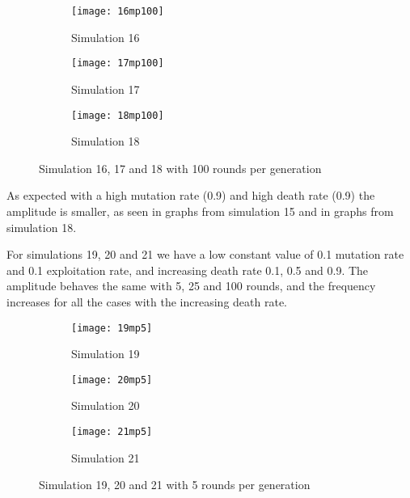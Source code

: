 \begin{figure}[H]       
    \centering
    \begin{subfigure}[b]{0.3\textwidth}
	\centering
	{\texttt{[image: 16mp100]}}   
    	\caption{Simulation 16}
	\label{fig:mpsim16100}
    \end{subfigure}
    \hfill
    \begin{subfigure}[b]{0.3\textwidth}
	\centering
	{\texttt{[image: 17mp100]}}   
    	\caption{Simulation 17}
	\label{fig:mpsim17100}
    \end{subfigure}
    \hfill
    \begin{subfigure}[b]{0.3\textwidth}
	\centering
	{\texttt{[image: 18mp100]}}   
    	\caption{Simulation 18}
	\label{fig:mpsim18100}
    \end{subfigure}
    \caption{Simulation 16, 17 and 18 with 100 rounds per generation}
    \label{mpsim161718simulations100}
\end{figure}

As expected with a high mutation rate (0.9) and high death rate (0.9) the amplitude is smaller, as seen in graphs from simulation 15 and in graphs from simulation 18.

For simulations 19, 20 and 21 we have a low constant value of 0.1 mutation rate and 0.1 exploitation rate, and increasing death rate 0.1, 0.5 and 0.9. The amplitude behaves the same with 5, 25 and 100 rounds, and the frequency increases for all the cases with the increasing death rate.

\begin{figure}[H]       
    \centering
    \begin{subfigure}[b]{0.3\textwidth}
	\centering
	{\texttt{[image: 19mp5]}}   
    	\caption{Simulation 19}
	\label{fig:mpsim195}
    \end{subfigure}
    \hfill
    \begin{subfigure}[b]{0.3\textwidth}
	\centering
	{\texttt{[image: 20mp5]}}   
    	\caption{Simulation 20}
	\label{fig:mpsim205}
    \end{subfigure}
    \hfill
    \begin{subfigure}[b]{0.3\textwidth}
	\centering
	{\texttt{[image: 21mp5]}}   
    	\caption{Simulation 21}
	\label{fig:mpsim215}
    \end{subfigure}
    \caption{Simulation 19, 20 and 21 with 5 rounds per generation}
    \label{mpsim192021simulations5}
\end{figure}


